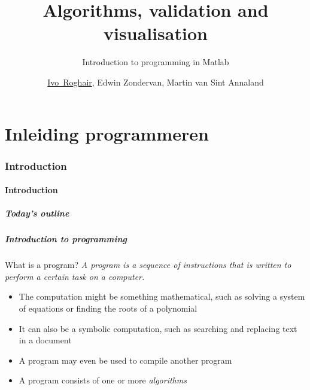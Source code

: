 \documentclass[11pt,table,final,fleqn,xcolor={usenames,dvipsnames}]{beamer}
\title{Algorithms, validation and visualisation}
\subtitle{Introduction to programming in Matlab}
\author[I.~Roghair]{\underline{Ivo~Roghair}, Edwin Zondervan, Martin van Sint Annaland}
\institute{Chemical Process Intensification\\Process Systems Engineering}
\date
\begin{document}

\part{Inleiding programmeren}
\frame[plain]{
  \titlepage
}


\section{Introduction}
\subsection*{Introduction}
\begin{frame}[label=contents,nonavbar]
  \frametitle{Today's outline}
\end{frame}

\begin{frame}
 \frametitle{Introduction to programming}
 \begin{block}{What is a program?}
  \emph{A program is a sequence of instructions that is written to perform a certain task on a computer.} %
  \end{block}
  \begin{itemize}
    \item The computation might be something mathematical, such as solving a system of equations or finding the roots of a polynomial
    \item It can also be a symbolic computation, such as searching and replacing text in a document 
    \item A program may even be used to compile another program
    \item A program consists of one or more \emph{algorithms}
  \end{itemize}
\end{frame}
\end{document}
